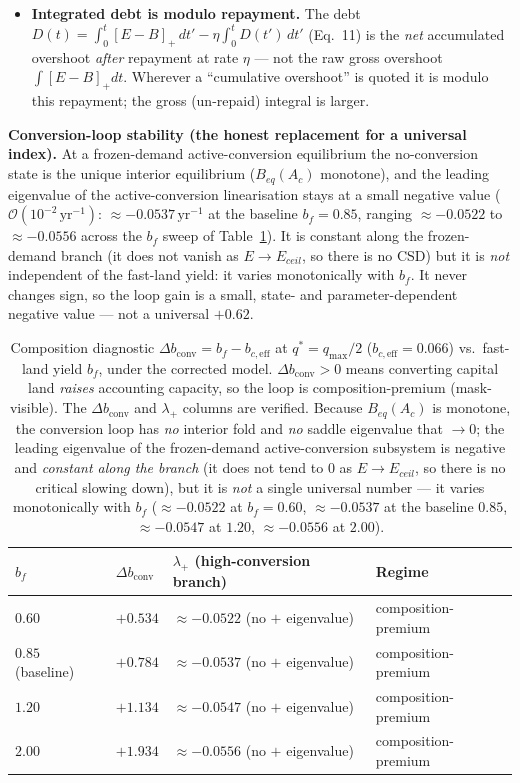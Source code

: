 \documentclass[11pt]{article}
\begin{document}
\begin{itemize}
\item \textbf{Integrated debt is modulo repayment.} The debt $D(t)=\int_0^t[E-B]_+\,dt'-\eta\int_0^tD(t')\,dt'$ (Eq.~11) is the \emph{net} accumulated overshoot \emph{after} repayment at rate $\eta$ --- not the raw gross overshoot $\int[E-B]_+dt$. Wherever a ``cumulative overshoot'' is quoted it is modulo this repayment; the gross (un-repaid) integral is larger.
\end{itemize}

\noindent\textbf{Conversion-loop stability (the honest replacement for a universal index).} At a frozen-demand
active-conversion equilibrium the no-conversion state is the unique interior equilibrium ($B_{eq}(A_c)$ monotone),
and the leading eigenvalue of the active-conversion linearisation stays at a small negative value
($\mathcal{O}(10^{-2}\,\text{yr}^{-1})$: $\approx-0.0537\,\text{yr}^{-1}$ at the baseline $b_f=0.85$, ranging
$\approx-0.0522$ to $\approx-0.0556$ across the $b_f$ sweep of Table~\ref{tab:conv}). It is constant along the
frozen-demand branch (it does not vanish as $E\to E_{ceil}$, so there is no CSD) but it is \emph{not} independent
of the fast-land yield: it varies monotonically with $b_f$. It never changes sign, so the loop gain is a
small, state- and parameter-dependent negative value --- not a universal $+0.62$.

\begin{table}[htbp]
\centering
\small
\begin{tabularx}{\textwidth}{ll>{\raggedright\arraybackslash}X>{\raggedright\arraybackslash}X}
\toprule
$b_f$ & $\Delta b_{\mathrm{conv}}$ & $\lambda_+$ (high-conversion branch) & Regime \\
\midrule
$0.60$ & $+0.534$ & $\approx-0.0522$ (no $+$ eigenvalue) & composition-premium \\
$0.85$ (baseline) & $+0.784$ & $\approx-0.0537$ (no $+$ eigenvalue) & composition-premium \\
$1.20$ & $+1.134$ & $\approx-0.0547$ (no $+$ eigenvalue) & composition-premium \\
$2.00$ & $+1.934$ & $\approx-0.0556$ (no $+$ eigenvalue) & composition-premium \\
\bottomrule
\end{tabularx}
\caption{Composition diagnostic $\Delta b_{\mathrm{conv}}=b_f-b_{c,\mathrm{eff}}$ at $q^*=q_{\max}/2$
($b_{c,\mathrm{eff}}=0.066$) vs.\ fast-land yield $b_f$, under the corrected model. $\Delta b_{\mathrm{conv}}>0$
means converting capital land \emph{raises} accounting capacity, so the loop is composition-premium
(mask-visible). The $\Delta b_{\mathrm{conv}}$ and $\lambda_+$ columns are verified. Because $B_{eq}(A_c)$ is
monotone, the conversion loop has \emph{no} interior fold and \emph{no} saddle eigenvalue that $\to0$; the
leading eigenvalue of the frozen-demand active-conversion subsystem is negative and \emph{constant along the
branch} (it does not tend to $0$ as $E\to E_{ceil}$, so there is no critical slowing down), but it is
\emph{not} a single universal number --- it varies monotonically with $b_f$ ($\approx-0.0522$ at
$b_f=0.60$, $\approx-0.0537$ at the baseline $0.85$, $\approx-0.0547$ at $1.20$, $\approx-0.0556$ at $2.00$).}
\label{tab:conv}
\end{table}
\end{document}

